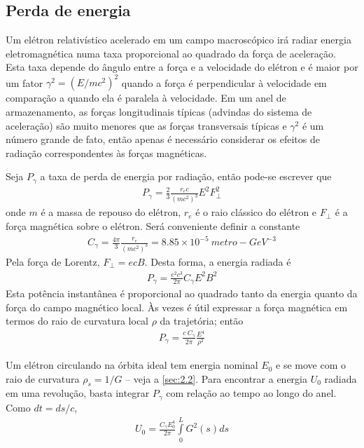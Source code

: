 \subsection{Perda de energia}\label{sec:4.1}
Um elétron relativístico acelerado em um campo macroscópico irá radiar energia eletromagnética numa taxa proporcional ao quadrado da força de aceleração. Esta taxa depende do ângulo entre a força e a velocidade do elétron e é maior por um fator $\gamma^2 = (E/mc^2)^2$ quando a força é perpendicular à velocidade em comparação a quando ela é paralela à velocidade. Em um anel de armazenamento, as forças longitudinais típicas (advindas do sistema de aceleração) são muito menores que as forças transversais típicas e $\gamma^2$ é um número grande de fato, então apenas é necessário considerar os efeitos de radiação correspondentes às forças magnéticas.

Seja $P_\gamma$ a taxa de perda de energia por radiação, então pode-se escrever que
\begin{align}
	P_\gamma = \frac{2}{3}\frac{r_e c}{(mc^2)^3} E^2 F_\perp^2
\end{align}
onde $m$ é a massa de repouso do elétron, $r_e$ é o raio clássico do elétron e $F_\perp$ é a força magnética sobre o elétron. Será conveniente definir a constante
\begin{align}
	C_\gamma = \frac{4\pi}{3}\frac{r_e}{(mc^2)^3} = 8.85 \times 10^{-5}\ metro-GeV^{-3}
\end{align}
Pela força de Lorentz, $F_\perp = ecB$. Desta forma, a energia radiada é
\begin{align}
	P_\gamma = \frac{e^2c^3}{2\pi}C_\gamma E^2 B^2\label{eq:4.3}
\end{align}
Esta potência instantânea é proporcional ao quadrado tanto da energia quanto da força do campo magnético local. Às vezes é útil expressar  a força magnética em termos do raio de curvatura local $\rho$ da trajetória; então
\begin{align}
	P_\gamma = \frac{c\ C_\gamma}{2\pi}\frac{E^4}{\rho^2}
\end{align}

Um elétron circulando na órbita ideal tem energia nominal $E_0$ e se move com o raio de curvatura $\rho_s = 1/G$ -- veja a \autoref{sec:2.2}. Para encontrar a energia $U_0$ radiada em uma revolução, basta integrar $P_\gamma$ com relação ao tempo  ao longo do anel. Como $dt = ds/c$,
\begin{align}
	U_0 = \frac{C_\gamma E_0^4}{2\pi}\int\limits_{0}^{L}G^2(s)ds\label{eq:4.5}
\end{align}


